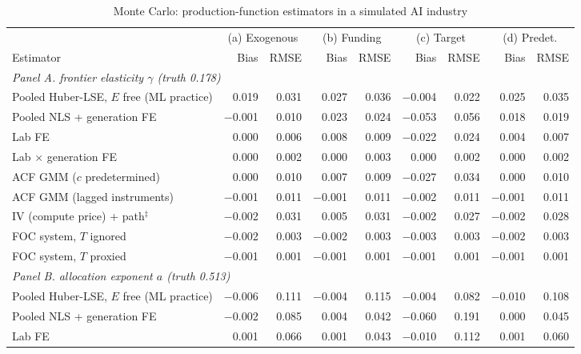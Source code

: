 \begin{table}[!htbp]
\centering
\begin{threeparttable}
\caption{Monte Carlo: production-function estimators in a simulated AI industry}
\label{tab:mc_industry}
\small
\begin{tabular}{lrrrrrrrr}
\toprule
 & \multicolumn{2}{c}{(a) Exogenous} & \multicolumn{2}{c}{(b) Funding} & \multicolumn{2}{c}{(c) Target} & \multicolumn{2}{c}{(d) Predet.} \\
\cmidrule(lr){2-3} \cmidrule(lr){4-5} \cmidrule(lr){6-7} \cmidrule(lr){8-9}
Estimator & Bias & RMSE & Bias & RMSE & Bias & RMSE & Bias & RMSE \\
\midrule
\multicolumn{9}{l}{\textit{Panel A. frontier elasticity $\gamma$ (truth 0.178)}} \\
Pooled Huber-LSE, $E$ free (ML practice) & 0.019 & 0.031 & 0.027 & 0.036 & $-$0.004 & 0.022 & 0.025 & 0.035 \\
Pooled NLS + generation FE & $-$0.001 & 0.010 & 0.023 & 0.024 & $-$0.053 & 0.056 & 0.018 & 0.019 \\
Lab FE & 0.000 & 0.006 & 0.008 & 0.009 & $-$0.022 & 0.024 & 0.004 & 0.007 \\
Lab $\times$ generation FE & 0.000 & 0.002 & 0.000 & 0.003 & 0.000 & 0.002 & 0.000 & 0.002 \\
ACF GMM ($c$ predetermined) & 0.000 & 0.010 & 0.007 & 0.009 & $-$0.027 & 0.034 & 0.000 & 0.010 \\
ACF GMM (lagged instruments) & $-$0.001 & 0.011 & $-$0.001 & 0.011 & $-$0.002 & 0.011 & $-$0.001 & 0.011 \\
IV (compute price) + path$^{\ddagger}$ & $-$0.002 & 0.031 & 0.005 & 0.031 & $-$0.002 & 0.027 & $-$0.002 & 0.028 \\
FOC system, $T$ ignored & $-$0.002 & 0.003 & $-$0.002 & 0.003 & $-$0.003 & 0.003 & $-$0.002 & 0.003 \\
FOC system, $T$ proxied & $-$0.001 & 0.001 & $-$0.001 & 0.001 & $-$0.001 & 0.001 & $-$0.001 & 0.001 \\
\midrule
\multicolumn{9}{l}{\textit{Panel B. allocation exponent $a$ (truth 0.513)}} \\
Pooled Huber-LSE, $E$ free (ML practice) & $-$0.006 & 0.111 & $-$0.004 & 0.115 & $-$0.004 & 0.082 & $-$0.010 & 0.108 \\
Pooled NLS + generation FE & $-$0.002 & 0.085 & 0.004 & 0.042 & $-$0.060 & 0.191 & 0.000 & 0.045 \\
Lab FE & 0.001 & 0.066 & 0.001 & 0.043 & $-$0.010 & 0.112 & 0.001 & 0.060 \\

\end{tabular}
\end{threeparttable}
\end{table}
